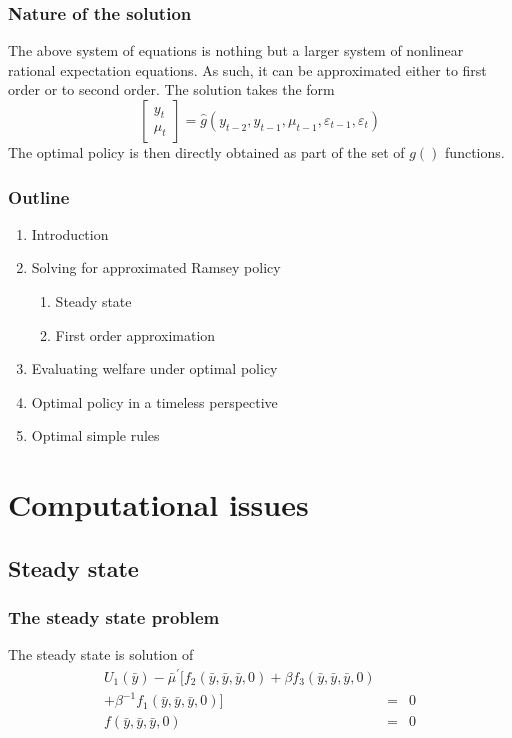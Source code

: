\documentclass{beamer}
\begin{document}
\begin{frame}
  \frametitle{Nature of the solution}
The above system of equations is nothing but a larger system of nonlinear rational expectation equations. As such, it can be approximated either to first order or to second order. The solution takes the form
\[
\left[
  \begin{array}{c}
    y_t\\\mu_t
  \end{array}\right] = \hat g\left(y_{t-2},y_{t-1},\mu_{t-1},\varepsilon_{t-1},\varepsilon_t\right)
\]
The optimal policy is then directly obtained as part of the set of $g()$ functions.
\end{frame}

\begin{frame}
  \frametitle{Outline}
  \begin{enumerate}
  \item Introduction
  \item Solving for approximated Ramsey policy
    \begin{enumerate}
    \item {\red Steady state}
    \item First order approximation
    \end{enumerate}
  \item Evaluating welfare under optimal policy
  \item Optimal policy in a timeless perspective
  \item Optimal simple rules
  \end{enumerate}
\end{frame}

\section{Computational issues}
\subsection{Steady state}
\begin{frame}
  \frametitle{The steady state problem}
The steady state is solution of
\begin{eqnarray*}
U_{1}(\bar y)-\bar\mu^{'}\big[f_{2}(\bar y, \bar y, \bar y,
0) +\beta f_{3}(\bar y,
\bar y, \bar y, 0) \\ 
+\beta^{-1}f_{1}(\bar y, \bar y, \bar y,
0)\big]&=&0\\
f(\bar y, \bar y, \bar y,
0)&=&0
\end{eqnarray*}

\end{frame}
\end{document}

